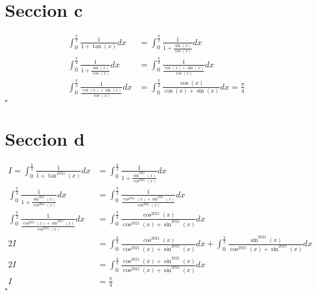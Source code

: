 \documentclass[spanish,12pt]{article}
\begin{document}
\section{Seccion c}
\begin{align*}
    \int_0^{\frac{\pi}{2}}\frac{1}{1+\tan(x)}dx&=\int_0^{\frac{\pi}{2}}\frac{1}{1+\frac{\sin(x)}{\cos(x)}}dx\\
    \int_0^{\frac{\pi}{2}}\frac{1}{1+\frac{\sin(x)}{\cos(x)}}dx&=\int_0^{\frac{\pi}{2}}\frac{1}{\frac{\cos{(x)}+\sin(x)}{\cos(x)}}dx\\
    \int_0^{\frac{\pi}{2}}\frac{1}{\frac{\cos{(x)}+\sin(x)}{\cos(x)}}dx&=\int_0^{\frac{\pi}{2}}\frac{\cos{(x)}}{\cos{(x)}+\sin(x)}dx= \frac{\pi}{4}
\end{align*}
\hfill $\square$

\section{Seccion d}
\begin{align*}
  I=\int_0^{\frac{\pi}{2}}\frac{1}{1+\tan^{2021}(x)}dx&=\int_0^{\frac{\pi}{2}}\frac{1}{1+\frac{\sin^{2021}(x)}{\cos^{2021}(x)}}dx\\
    \int_0^{\frac{\pi}{2}}\frac{1}{1+\frac{\sin^{2021}(x)}{\cos^{2021}(x)}}dx&=\int_0^{\frac{\pi}{2}}\frac{1}{\frac{\cos^{2021}{(x)}+\sin^{2021}(x)}{\cos^{2021}(x)}}dx\\
    \int_0^{\frac{\pi}{2}}\frac{1}{\frac{\cos^{2021}{(x)}+\sin^{2021}(x)}{\cos^{2021}(x)}}dx&=\int_0^{\frac{\pi}{2}}\frac{\cos^{2021}{(x)}}{\cos^{2021}{(x)}+\sin^{2021}(x)}dx\\
    2I&=\int_0^{\frac{\pi}{2}}\frac{\cos^{2021}{(x)}}{\cos^{2021}{(x)}+\sin^{2021}(x)}dx+\int_0^{\frac{\pi}{2}}\frac{\sin^{2021}{(x)}}{\cos^{2021}{(x)}+\sin^{2021}(x)}dx\\
    2I&=\int_0^{\frac{\pi}{2}}\frac{\cos^{2021}{(x)}+\sin^{2021}(x)}{\cos^{2021}{(x)}+\sin^{2021}(x)}dx\\
    I&=\frac{\pi}{4}
\end{align*}
\hfill $\square$
\end{document}
